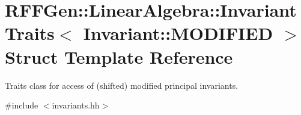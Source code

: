 \hypertarget{structRFFGen_1_1LinearAlgebra_1_1InvariantTraits_3_01Invariant_1_1MODIFIED_01_4}{\section{R\-F\-F\-Gen\-:\-:Linear\-Algebra\-:\-:Invariant\-Traits$<$ Invariant\-:\-:M\-O\-D\-I\-F\-I\-E\-D $>$ Struct Template Reference}
\label{structRFFGen_1_1LinearAlgebra_1_1InvariantTraits_3_01Invariant_1_1MODIFIED_01_4}
}


Traits class for access of (shifted) modified principal invariants.  




{\ttfamily \#include $<$invariants.\-hh$>$}

